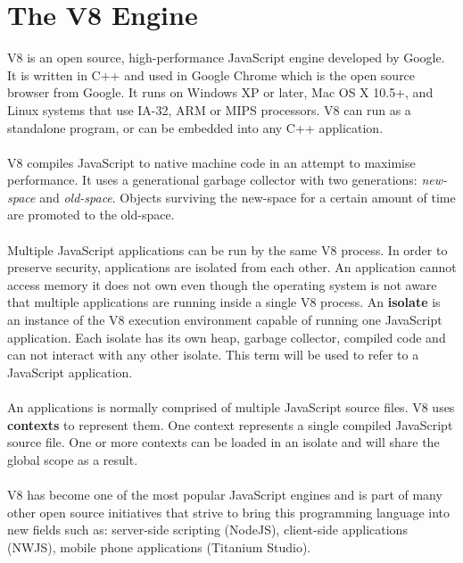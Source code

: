 \documentclass{l4proj}
\begin{document}
\section{The V8 Engine}
\hspace*{1em} V8 is an open source, high-performance JavaScript engine developed by Google. It is written in C++ and used in Google Chrome which is the open source browser from Google. It runs on Windows XP or later, Mac OS X 10.5+, and Linux systems that use IA-32, ARM or MIPS processors. V8 can run as a standalone program, or can be embedded into any C++ application\cite{v8}.
\\\\
\hspace*{1em} V8 compiles JavaScript to native machine code in an attempt to maximise performance. It uses a generational garbage collector with two generations: \textit{new-space} and \textit{old-space}. Objects surviving the new-space for a certain amount of time are promoted to the old-space.
\\\\
\hspace*{1em} Multiple JavaScript applications can be run by the same V8 process. In order to preserve security, applications are isolated from each other. An application cannot access memory it does not own even though the operating system is not aware that multiple applications are running inside a single V8 process. An \textbf{isolate} is an instance of the V8 execution environment capable of running one JavaScript application. Each isolate has its own heap, garbage collector, compiled code and can not interact with any other isolate. This term will be used to refer to a JavaScript application.
\\\\
\hspace*{1em} An applications is normally comprised of multiple JavaScript source files. V8 uses \textbf{contexts} to represent them. One context represents a single compiled JavaScript source file. One or more contexts can be loaded in an isolate and will share the global scope as a result. 
\\\\
\hspace*{1em} V8 has become one of the most popular JavaScript engines and is part of many other open source initiatives that strive to bring this programming language into new fields such as: server-side scripting (NodeJS), client-side applications (NWJS), mobile phone applications (Titanium Studio).
\end{document}
